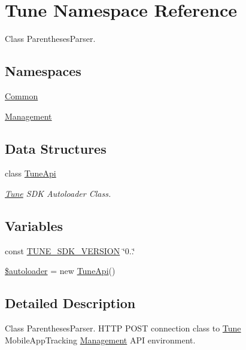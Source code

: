 \hypertarget{namespaceTune}{\section{Tune Namespace Reference}
\label{namespaceTune}
}


Class Parentheses\-Parser.  


\subsection*{Namespaces}
\begin{DoxyCompactItemize}
\item 
\hyperlink{namespaceTune_1_1Common}{Common}
\item 
\hyperlink{namespaceTune_1_1Management}{Management}
\end{DoxyCompactItemize}
\subsection*{Data Structures}
\begin{DoxyCompactItemize}
\item 
class \hyperlink{classTune_1_1TuneApi}{Tune\-Api}
\begin{DoxyCompactList}\small\item\em \hyperlink{namespaceTune}{Tune} S\-D\-K Autoloader Class. \end{DoxyCompactList}\end{DoxyCompactItemize}
\subsection*{Variables}
\begin{DoxyCompactItemize}
\item 
const \hyperlink{namespaceTune_a064a74b8093f320885e1a817c501a0cc}{T\-U\-N\-E\-\_\-\-S\-D\-K\-\_\-\-V\-E\-R\-S\-I\-O\-N} \char`\"{}0..\char`\"{}
\item 
\hyperlink{namespaceTune_a45833c84db9823c05fccd9d72c991286}{\$autoloader} = new \hyperlink{classTune_1_1TuneApi}{Tune\-Api}()
\end{DoxyCompactItemize}


\subsection{Detailed Description}
Class Parentheses\-Parser. H\-T\-T\-P P\-O\-S\-T connection class to \hyperlink{namespaceTune}{Tune} Mobile\-App\-Tracking \hyperlink{namespaceTune_1_1Management}{Management} A\-P\-I environment.

